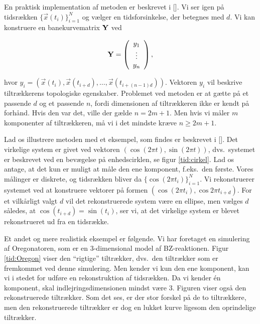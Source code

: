 \vspace{4.0mm}
En praktisk implementation af metoden er beskrevet i
[]. Vi ser igen p{\aa} tidsr{\ae}kken
$\{\vec{x}(t_i)\}_{i=1}^{N}$ og v{\ae}lger en
tidsforsinkelse, der betegnes med $d$. Vi kan konstruere en
banekurvematrix $\mbox{${\bf Y}$}$ ved

\begin{equation}
\label{tid:banekurvematr}
  \mbox{${\bf Y}$} = \left( \begin{array}{c}
                y_1 \\
                \vdots \\
                y_n
             \end{array}
      \right),
\end{equation}

hvor $y_i = (\vec{x}(t_i), \vec{x}(t_{i+d}), \ldots,
\vec{x}(t_{i+(n-1)d}))$. Vektoren $y_i$ vil beskrive
til\-tr{\ae}k\-ke\-rens topologiske egenskaber. Problemet
ved metoden er at g{\ae}tte p{\aa} et passende $d$ og et
passende $n$, fordi dimensionen af tiltr{\ae}kkeren ikke er
kendt p{\aa} forh{\aa}nd. Hvis den var det, ville der
g{\ae}lde $n=2m+1$. Men hvis vi m{\aa}ler $m$ komponenter
af tiltr{\ae}kkeren, m{\aa} vi i det mindste kr{\ae}ve
$n\ge 2m+1$.

\vspace{4.0mm}
Lad os illustrere metoden med et eksempel, som findes er
beskrevet i []. Det virkelige system er
givet ved vektoren $(\cos(2\pi t), \sin(2\pi t))$, dvs.\
systemet er beskrevet ved en bev{\ae}gelse p{\aa}
enhedscirklen, se figur \ref{tid:cirkel}. Lad os antage, at
det kun er muligt at m{\aa}le den ene komponent, f.eks.\
den f{\o}rste. Vores m{\aa}linger er diskrete, og 
tidsr{\ae}kken bliver da $\{\cos(2\pi t_i)\}_{i=1}^N$. Vi
rekonstruerer systemet ved at konstruere vektorer p{\aa}
formen $(\cos(2\pi t_i), \cos 2\pi t_{i+d})$. For et
vilk{\aa}rligt valgt $d$ vil det rekonstruerede system
v{\ae}re en ellipse, men v{\ae}lges $d$ s{\aa}ledes, at
$\cos(t_{i+d}) = \sin(t_i)$, ser vi, at det virkelige
system er blevet rekonstrueret ud fra en tidsr{\ae}kke.

\vspace{4.0mm}
Et andet og mere realistisk eksempel er f{\o}lgende. Vi har
foretaget en simulering af Oregonatoren, som er en
3-dimensional model af BZ-reaktionen. Figur
\ref{tid:Oregon} viser den ``rigtige'' tiltr{\ae}kker,
dvs.\ den tiltr{\ae}kker som er fremkommet ved denne
simulering. Men kender vi kun den ene komponent, kan vi i
stedet for udf{\o}re en rekonstruktion af tidsr{\ae}kken.
Da vi kender \'{e}n komponent, skal indlejringsdimensionen
mindst v{\ae}re 3. Figuren viser ogs{\aa} den
rekonstruerede tiltr{\ae}kker. Som det ses, er der stor
forskel p{\aa} de to tiltr{\ae}kkere, men
den rekonstruerede tiltr{\ae}kker er dog en lukket kurve
ligesom den oprindelige tiltr{\ae}kker.

